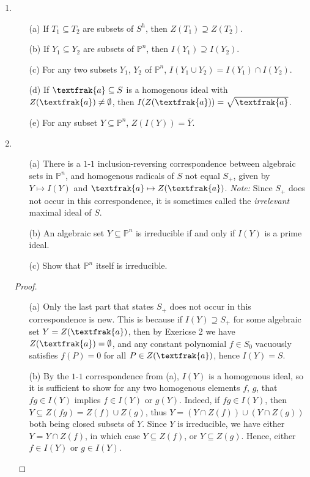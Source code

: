 \documentclass[12pt]{article}
\newcommand{\goth}[1]{\textfrak{#1}}
\newcommand{\PP}{\mathbb{P}}
\theoremstyle{definition}
\begin{document}
\begin{enumerate} [label=\textbf{\arabic*.}, leftmargin=-0.05em]
\item \begin{itemize}
    \item[(a)] If $T_1 \subseteq T_2$ are subsets of $S^h$, then $Z(T_1) \supseteq Z(T_2)$.
    \item[(b)] If $Y_1 \subseteq Y_2$ are subsets of $\PP^n$, then $I(Y_1) \supseteq I(Y_2)$.
    \item[(c)] For any two subsets $Y_1$, $Y_2$ of $\PP^n$, $I(Y_1 \cup Y_2) = I(Y_1) \cap I(Y_2)$.
    \item[(d)] If $\goth{a} \subseteq S$ is a homogenous ideal with $Z(\goth{a}) \neq \emptyset$, then $I(Z(\goth{a})) = \sqrt{\goth{a}}$.
    \item[(e)] For any subset $Y \subseteq \PP^n$, $Z(I(Y)) = \overline{Y}$.
\end{itemize}

\item \begin{itemize}
    \item[(a)] There is a $1$-$1$ inclusion-reversing correspondence between algebraic sets in $\PP^n$, and homogenous radicals of $S$ not equal $S_+$, given by $Y \mapsto I(Y)$ and $\goth{a} \mapsto Z(\goth{a})$. \textit{Note:} Since $S_+$ does not occur in this correspondence, it is sometimes called the \textit{irrelevant} maximal ideal of $S$.
    \item[(b)] An algebraic set $Y \subseteq \PP^n$ is irreducible if and only if $I(Y)$ is a prime ideal.
    \item[(c)] Show that $\PP^n$ itself is irreducible.
\end{itemize}

\newpage

\begin{proof} $ $ \vspace{0pt}
    \begin{itemize}
        \item[(a)] Only the last part that states $S_+$ does not occur in this correspondence is new. This is because if $I(Y) \supseteq S_+$ for some algebraic set $Y = Z(\goth{a})$, then by Exericse 2 we have $Z(\goth{a}) = \emptyset$, and any constant polynomial $f \in S_0$ vacuously satisfies $f(P) = 0$ for all $P \in Z(\goth{a})$, hence $I(Y) = S$.

        \item[(b)] By the $1$-$1$ correspondence from (a), $I(Y)$ is a homogenous ideal, so it is sufficient to show for any two homogenous elements $f$, $g$, that $fg \in I(Y)$ implies $f \in I(Y)$ or $g(Y)$. Indeed, if $fg \in I(Y)$, then $Y \subseteq Z(fg) = Z(f) \cup Z(g)$, thus $Y = (Y \cap Z(f)) \cup (Y \cap Z(g))$ both being closed subsets of $Y$. Since $Y$ is irreducible, we have either $Y = Y \cap Z(f)$, in which case $Y \subseteq Z(f)$, or $Y \subseteq Z(g)$. Hence, either $f \in I(Y)$ or $g \in I(Y)$.


\end{itemize}
\end{proof}
\end{enumerate}
\end{document}
